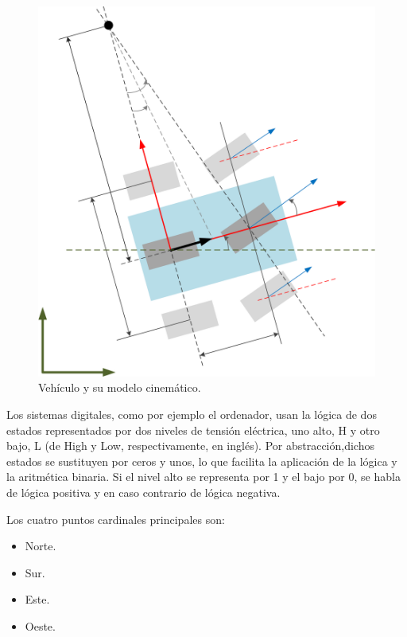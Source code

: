 \documentclass[conference,compsoc,onecolumn]{IEEEtran}
\begin{document}
 \begin{figure}[h!]
\centering
\includegraphics[scale=0.49]{bib/.png}
\caption{Vehículo y su modelo cinemático.}
\label{fig:imagen laboratorio 1}
\end{figure}


Los sistemas digitales, como por ejemplo el ordenador, usan la lógica de dos estados representados por dos
niveles de tensión eléctrica, uno alto, H y otro bajo, L (de High y Low, respectivamente, en inglés). Por abstracción,dichos estados se sustituyen por ceros y unos, lo que facilita la aplicación de la lógica y la aritmética binaria. Si el
nivel alto se representa por 1 y el bajo por 0, se habla de lógica positiva y en caso contrario de lógica negativa.

Los cuatro puntos cardinales principales son:
\begin{itemize}
    \item Norte.
    \item Sur.
    \item Este.
    \item Oeste.
\end{itemize}
\end{document}
